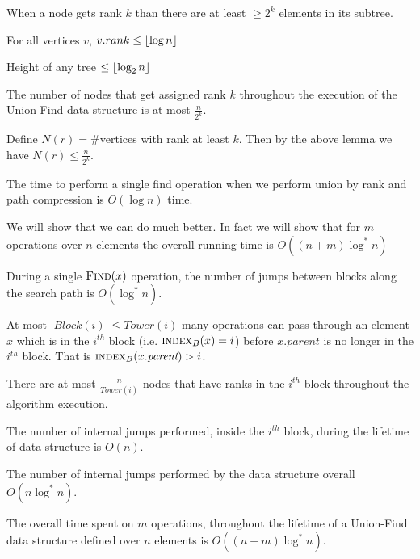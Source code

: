 \begin{lemma}{}{}
	When a node gets rank $k$ than there are at least $\geq 2^k$ elements in its subtree.
\end{lemma}
\begin{corolary}{}{}
	For all vertices $v$, $v.rank\leq \left\lfloor \log n\right\rfloor$
\end{corolary}
\begin{corolary}{}{}
	Height of any tree $\leq \left\lfloor\log _2n\right\rfloor$
\end{corolary}
\begin{lemma}{}{}
	The number of nodes that get assigned rank $k$ throughout the execution of the Union-Find data-structure is at most $\frac{n}{2^k}$. 
\end{lemma}
Define $N(r)=\#$vertices with rank at least $k$. Then by the above lemma we have $N(r)\leq \frac{n}{2^k}$.
\begin{lemma}{}{}
	 The time to perform a single find operation when we perform union by rank and path
	compression is $O(\log n)$ time.
\end{lemma}
We will show that we can do much better. In fact we will show that for $m$ operations over $n$ elements the overall running time is $O((n+m)\log ^*n)$

\begin{lemma}{}{}
	During a single $\textsc{Find}(x)$ operation, the number of jumps between blocks along the search path is $O(\log^*n)$.
\end{lemma}
\begin{lemma}{}{}
	At most $|\textit{Block}(i)|\leq \textit{Tower}(i)$ many  operations can pass through an element $x$ which is in the $i^{th}$ block (i.e. $\textsc{index}_B(x)=i$) before $x.\textit{parent}$ is no longer in the $i^{th}$ block. That is $\textsc{index}_B(x.\textit{parent})>i$.
\end{lemma}

\begin{lemma}{}{}
	There are at most $\frac{n}{\textit{Tower}(i)}$ nodes that have ranks in the $i^{th}$ block throughout the algorithm execution.
\end{lemma}

\begin{lemma}{}{}
	The number of internal jumps performed, inside the $i^{th}$ block, during the lifetime of  data structure is $O(n)$.
\end{lemma}

\begin{Theorem}{}{}
	The number of internal jumps performed by the  data structure overall $O(n\log^*n)$.
\end{Theorem}
\begin{Theorem}{}{}
	The overall time spent on $m$  operations, throughout the lifetime of a Union-Find data structure defined over $n$ elements is $O((n+m)\log^*n)$.
\end{Theorem}